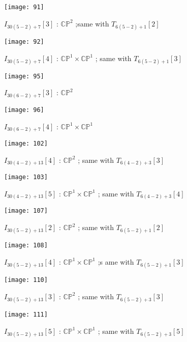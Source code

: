 \documentclass[reqno, twoside, a4paper]{amsart}
\theoremstyle{definition}
\numberwithin{equation}{section}
\begin{document}
\begin{figure}[H]
  \centering
  \texttt{[image: 91]}
  \caption{$I_{30(5-2)+7}[3]$ : $\mathbb{CP}^2$ ;same with $T_{6(5-2)+1}[2]$}
\end{figure}

\begin{figure}[H]
  \centering
  \texttt{[image: 92]}
  \caption{$I_{30(5-2)+7}[4]$ : $\mathbb{CP}^1 \times \mathbb{CP}^1$ ; same with $T_{6(5-2)+1}[3]$}
\end{figure}

\begin{figure}[H]
  \centering
  \texttt{[image: 95]}
  \caption{$I_{30(6-2)+7}[3]$ : $\mathbb{CP}^2$}
\end{figure}

\begin{figure}[H]
  \centering
  \texttt{[image: 96]}
  \caption{$I_{30(6-2)+7}[4]$ : $\mathbb{CP}^1 \times \mathbb{CP}^1$}
\end{figure}

\begin{figure}[H]
  \centering
  \texttt{[image: 102]}
  \caption{$I_{30(4-2)+13}[4]$ : $\mathbb{CP}^2$ ; same with $T_{6(4-2)+3}[3]$}
\end{figure}

\begin{figure}[H]
  \centering
  \texttt{[image: 103]}
  \caption{$I_{30(4-2)+13}[5]$ : $\mathbb{CP}^1 \times \mathbb{CP}^1$ ; same with $T_{6(4-2)+3}[4]$}
\end{figure}

\begin{figure}[H]
  \centering
  \texttt{[image: 107]}
  \caption{$I_{30(5-2)+13}[2]$ : $\mathbb{CP}^2$ ; same with $T_{6(5-2)+1}[2]$}
\end{figure}

\begin{figure}[H]
  \centering
  \texttt{[image: 108]}
  \caption{$I_{30(5-2)+13}[4]$ : $\mathbb{CP}^1 \times \mathbb{CP}^1$ ;s ame with $T_{6(5-2)+1}[3]$}
\end{figure}

\begin{figure}[H]
  \centering
  \texttt{[image: 110]}
  \caption{$I_{30(5-2)+13}[3]$ : $\mathbb{CP}^2$ ; same with $T_{6(5-2)+3}[3]$}
\end{figure}

\begin{figure}[H]
  \centering
  \texttt{[image: 111]}
  \caption{$I_{30(5-2)+13}[5]$ : $\mathbb{CP}^1 \times \mathbb{CP}^1$ ; same with $T_{6(5-2)+3}[5]$}
\end{figure}
\end{document}
